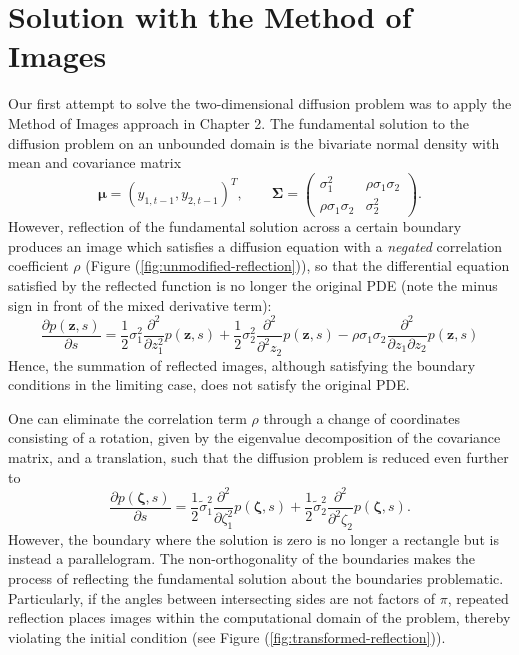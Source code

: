 \section{Solution with the Method of Images}
Our first attempt to solve the two-dimensional diffusion problem was to apply the Method of Images approach in Chapter 2. The fundamental solution to the diffusion problem on an unbounded domain is the bivariate normal density with mean and covariance matrix 
\[ \boldsymbol{\mu} = (y_{1,t-1}, y_{2,t-1})^T, \qquad \boldsymbol{\Sigma} = \left( \begin{array}{cc}
															\sigma_1^2 & \rho \sigma_1 \sigma_2 \\
															\rho \sigma_1 \sigma_2 & \sigma_2^2 		
															\end{array} \right). \]
However, reflection of the fundamental solution across a certain boundary produces an image which satisfies a diffusion equation with a \textit{negated} correlation coefficient $\rho$ (Figure (\ref{fig:unmodified-reflection})), so that the differential equation satisfied by the reflected function is no longer the original PDE (note the minus sign in front of the mixed derivative term): 
\[ 
	\frac{\partial p(\mathbf{z},s)}{\partial s} = \frac{1}{2}\sigma_1^2 \frac{\partial^2}{\partial z_1^2} p(\mathbf{z},s) + \frac{1}{2} \sigma_2^2 \frac{\partial^2}{\partial^2 z_2}p(\mathbf{z},s) - \rho \sigma_1 \sigma_2 \frac{\partial^2}{\partial z_1 \partial z_2} p(\mathbf{z}, s)
\]
Hence, the summation of reflected images, although satisfying the boundary conditions in the limiting case, does not satisfy the original PDE. 

One can eliminate the correlation term $\rho$ through a change of coordinates consisting of a rotation, given by the eigenvalue decomposition of the covariance matrix, and a translation, such that the diffusion problem is reduced even further to
\[
\frac{\partial p(\boldsymbol{\zeta},s)}{\partial s} = \frac{1}{2}\tilde{\sigma}_1^2 \frac{\partial^2}{\partial \zeta_1^2} p(\boldsymbol{\zeta},s) + \frac{1}{2} \tilde{\sigma}_2^2 \frac{\partial^2}{\partial^2 \zeta_2}p(\boldsymbol{\zeta},s).
\]
However, the boundary where the solution is zero is no longer a rectangle but is instead a parallelogram. The non-orthogonality of the boundaries makes the process of reflecting the fundamental solution about the boundaries problematic. Particularly, if the angles between intersecting sides are not factors of $\pi$, repeated reflection places images within the computational domain of the problem, thereby violating the initial condition (see Figure (\ref{fig:transformed-reflection})). 

